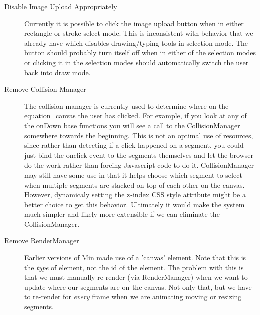 \documentclass[letterpaper]{article}
\begin{document}
\begin{description}
    \item[Disable Image Upload Appropriately] Currently it is possible to click the image
        upload button when in either rectangle or stroke select mode. This is
        inconsistent with behavior that we already have which disables
        drawing/typing tools in selection mode. The button should probably turn
        itself off when in either of the selection modes or clicking it in the
        selection modes should automatically switch the user back into draw
        mode.
    \item[Remove Collision Manager] The collision manager is currently used to
        determine where on the equation\_canvas the user has clicked. For
        example, if you look at any of the onDown base functions you will see a
        call to the CollisionManager somewhere towards the beginning. This is
        not an optimal use of resources, since rather than detecting if a
        click happened on a segment, you could just bind the onclick event to
        the segments themselves and let the browser do the work rather than
        forcing Javascript code to do it. CollisionManager may still have some
        use in that it helps choose which segment to select when multiple
        segments are stacked on top of each other on the canvas. However,
        dynamicaly setting the z-index CSS style attribute might be a better
        choice to get this behavior. Ultimately it would make the system much
        simpler and likely more extensible if we can eliminate the
        CollisionManager.
    \item[Remove RenderManager] Earlier versions of Min made use of a 'canvas'
        element. Note that this is the \emph{type} of element, not the id of the
        element. The problem with this is that we must manually re-render (via
        RenderManager) when we want to update where our segments are on the
        canvas. Not only that, but we have to re-render for \emph{every} frame
        when we are animating moving or resizing segments. 
        

\end{description}
\end{document}
